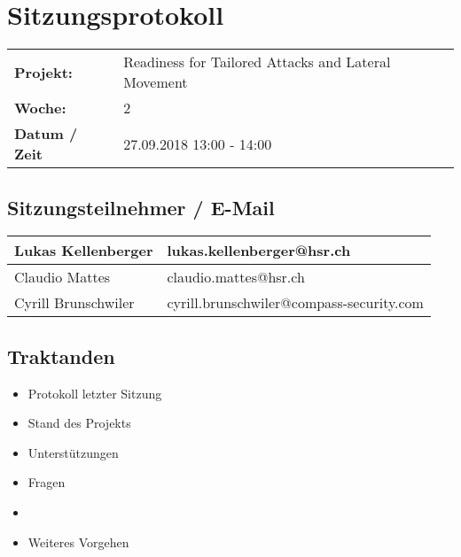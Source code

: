 \newcommand{\TITLE}{Readiness for Tailored Attacks and Lateral Movement Detection}
\newcommand{\REVIEW}{Wöchentliches Meeting}
\newcommand{\VERSION}{0.0}





\section*{Sitzungsprotokoll}

\begin{tabular}{p{4cm} p{12cm}}
    \textbf{Projekt:} & Readiness for Tailored Attacks and Lateral Movement  \\
    \textbf{Woche:} & 2 \\
    \textbf{Datum / Zeit} & 27.09.2018 13:00 - 14:00 \\
\end{tabular}

\subsection*{Sitzungsteilnehmer / E-Mail}
\begin{table}[H]
    \centering
    \begin{tabular}{p{4cm} p{12cm}} \hline
        Lukas Kellenberger & lukas.kellenberger@hsr.ch \\ \hline
        Claudio Mattes & claudio.mattes@hsr.ch \\ \hline
        Cyrill Brunschwiler & cyrill.brunschwiler@compass-security.com \\ \hline
    \end{tabular}
\end{table}

\vspace{1cm}

\subsection*{Traktanden}
\begin{itemize}
    \item Protokoll letzter Sitzung
    \item Stand des Projekts
    \item Unterstützungen
    \item Fragen
    \item <Aufzählung von aktuellen Traktanden oder wichtigen Punkten>
    \item Weiteres Vorgehen
\end{itemize}


